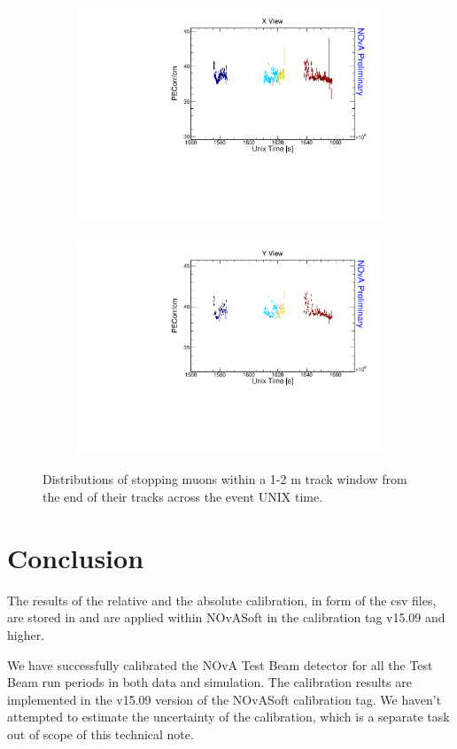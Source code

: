 \begin{figure}[!ht]
\begin{subfigure}{0.495\textwidth}
  \end{subfigure}
  \begin{subfigure}{0.495\textwidth}
    \includegraphics[width=\linewidth]{driftsec_tb/pecorrcm_time_x.pdf}
  \end{subfigure}
  \begin{subfigure}{0.495\textwidth}
    \includegraphics[width=\linewidth]{driftsec_tb/pecorrcm_time_y.pdf}
  \end{subfigure}
  \caption{Distributions of stopping muons within a 1-2 m track window from the end of their tracks across the event UNIX time.}
  \label{fig:AbsCalibDrift1}
\end{figure}

\section{Conclusion}
The results of the relative and the absolute calibration, in form of the csv files, are stored in and are applied within NOvASoft in the calibration tag v15.09 and higher.


We have successfully calibrated the NOvA Test Beam detector for all the Test Beam run periods in both data and simulation. The calibration results are implemented in the v15.09 version of the NOvASoft calibration tag. We haven't attempted to estimate the uncertainty of the calibration, which is a separate task out of scope of this technical note.